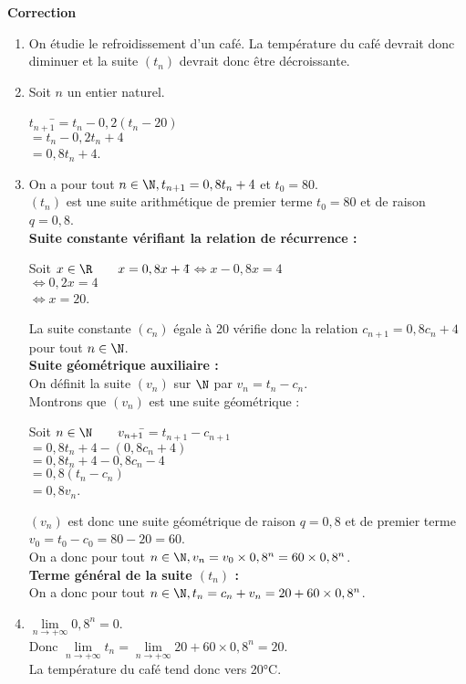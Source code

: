 \documentclass[a4paper,11pt,exos]{nsi} %
\begin{document}
\textcolor{UGLiBlue}{\textbf{Correction}
\begin{enumerate}
    \item On étudie le refroidissement d'un café. La température du café devrait donc diminuer et la suite $(t_n)$ devrait donc être décroissante.
    \item Soit $n$ un entier naturel.
    \begin{tabbing}
        $t_{n+1}$\=$=t_n-0,2(t_n-20)$\\
        \> $=t_n-0,2t_n+4$\\
        \> $=0,8t_n+4$.
    \end{tabbing}
    \item On a pour tout $n\in\N, t_{n+1}=0,8t_n+4$ et $t_0=80$.\\
    $(t_n)$ est une suite arithmétique de premier terme $t_0=80$ et de raison $q=0,8$.\\[.5em]
    \textbf{Suite constante vérifiant la relation de récurrence :} \begin{tabbing}
        Soit $x\in\R \qquad x=0,8x+4$\=$\Leftrightarrow x-0,8x=4$\\
        \>$\Leftrightarrow 0,2x=4$\\
        \>$\Leftrightarrow x=20$.
    \end{tabbing}
    La suite constante $(c_n)$ égale à 20 vérifie donc la relation $c_{n+1}=0,8c_n+4$ pour tout $n\in\N$.\\[.5em]
    \textbf{Suite géométrique auxiliaire :}\\[.5em]
    On définit la suite $(v_n)$ sur $\N$ par $v_n=t_n-c_n$.\\
    Montrons que $(v_n)$ est une suite géométrique :
    \begin{tabbing}
        Soit $n\in\N \qquad v_{n+1}$\=$=t_{n+1}-c_{n+1}$\\
        \> $=0,8t_n+4-(0,8c_n+4)$\\
        \> $=0,8t_n+4-0,8c_n-4$\\
        \> $=0,8(t_n-c_n)$\\
        \> $=0,8v_n$.
    \end{tabbing}
    $(v_n)$ est donc une suite géométrique de raison $q=0,8$ et de premier terme $v_0=t_0-c_0=80-20=60$.\\
    On a donc pour tout $n\in\N, v_n=v_0\times 0,8^n=60\times 0,8^n$.\\[.5em]
    \textbf{Terme général de la suite $(t_n)$ :}\\[.5em]
    On a donc pour tout $n\in\N, t_n=c_n+v_n=20+60\times 0,8^n$.\\
    \item $\lim\limits_{n\to+\infty}0,8^n=0$.\\[.5em]
    Donc $\lim\limits_{n\to+\infty} t_n=\lim\limits_{n\to+\infty}20+60\times 0,8^n=20$.\\[.5em]
    La température du café tend donc vers 20°C.
\end{enumerate}
}
\end{document}
